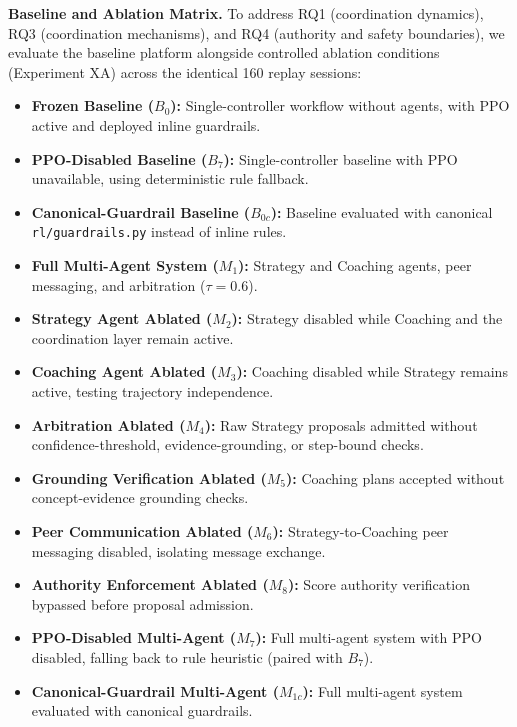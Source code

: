 \noindent\textbf{Baseline and Ablation Matrix.}
To address RQ1 (coordination dynamics), RQ3 (coordination mechanisms), and RQ4 (authority and safety boundaries), we evaluate the baseline platform alongside controlled ablation conditions (Experiment XA) across the identical 160 replay sessions:
\begin{itemize}\setlength{\itemsep}{0pt}\setlength{\parskip}{0pt}\setlength{\parsep}{0pt}
\item \textbf{Frozen Baseline ($B_0$):} Single-controller workflow without agents, with PPO active and deployed inline guardrails.
\item \textbf{PPO-Disabled Baseline ($B_7$):} Single-controller baseline with PPO unavailable, using deterministic rule fallback.
\item \textbf{Canonical-Guardrail Baseline ($B_{0c}$):} Baseline evaluated with canonical \texttt{rl/guardrails.py} instead of inline rules.
\item \textbf{Full Multi-Agent System ($M_1$):} Strategy and Coaching agents, peer messaging, and arbitration ($\tau = 0.6$).
\item \textbf{Strategy Agent Ablated ($M_2$):} Strategy disabled while Coaching and the coordination layer remain active.
\item \textbf{Coaching Agent Ablated ($M_3$):} Coaching disabled while Strategy remains active, testing trajectory independence.
\item \textbf{Arbitration Ablated ($M_4$):} Raw Strategy proposals admitted without confidence-threshold, evidence-grounding, or step-bound checks.
\item \textbf{Grounding Verification Ablated ($M_5$):} Coaching plans accepted without concept-evidence grounding checks.
\item \textbf{Peer Communication Ablated ($M_6$):} Strategy-to-Coaching peer messaging disabled, isolating message exchange.
\item \textbf{Authority Enforcement Ablated ($M_8$):} Score authority verification bypassed before proposal admission.
\item \textbf{PPO-Disabled Multi-Agent ($M_7$):} Full multi-agent system with PPO disabled, falling back to rule heuristic (paired with $B_7$).
\item \textbf{Canonical-Guardrail Multi-Agent ($M_{1c}$):} Full multi-agent system evaluated with canonical guardrails.
\end{itemize}

